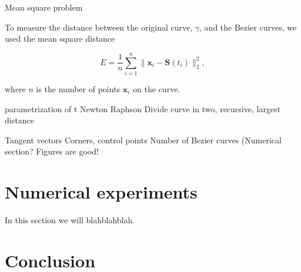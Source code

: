 \documentclass[10pt]{article}
\begin{document}
Mean square problem

To measure the distance between the original curve, $\gamma$, and the Bezier curves, we used the mean square distance 

\begin{equation}
E = \frac{1}{n} \sum_{i=1}^{n} \|\mathbf{x}_i - \mathbf{S}(t_i)\|^2_2,
\end{equation}

where $n$ is the number of points $\mathbf{x}_i$ on the curve. 

parametrization of t
Newton Raphson
Divide curve in two, recursive, largest distance

Tangent vectors
Corners, control points
Number of Bezier curves (Numerical section?
Figures are good!


\section{Numerical experiments}

In this section we will blahblahblah. 



\section{Conclusion}
\cite{Plass:1983}


\end{document}

